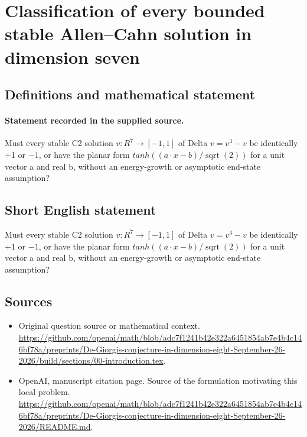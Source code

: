 \documentclass[11pt]{article}
\begin{document}
\section*{Classification of every bounded stable Allen–Cahn solution in dimension seven}\label{statement}
\subsection{Definitions and mathematical statement}
\paragraph{Statement recorded in the supplied source.}
Must every stable C2 solution $v:R^7\to [-1,1]$ of Delta $v=v^3-v$ be identically +1 or $-1$, or have the planar form $tanh((a\cdot x-b)/\operatorname{sqrt}(2))$ for a unit vector a and real b, without an energy-growth or asymptotic end-state assumption?
\subsection{Short English statement}
Must every stable C2 solution $v:R^7\to [-1,1]$ of Delta $v=v^3-v$ be identically +1 or $-1$, or have the planar form $tanh((a\cdot x-b)/\operatorname{sqrt}(2))$ for a unit vector a and real b, without an energy-growth or asymptotic end-state assumption?
\subsection{Sources}
\begin{itemize}
\item[S1] Original question source or mathematical context.
\url{https://github.com/openai/math/blob/adc7f1241b42e322a6451854ab7e4b4c146bf78a/preprints/De-Giorgis-conjecture-in-dimension-eight-September-26-2026/build/sections/00-introduction.tex}.
\item[S2] OpenAI, manuscript citation page. Source of the formulation motivating this local problem.
\url{https://github.com/openai/math/blob/adc7f1241b42e322a6451854ab7e4b4c146bf78a/preprints/De-Giorgis-conjecture-in-dimension-eight-September-26-2026/README.md}.
\end{itemize}
\end{document}
